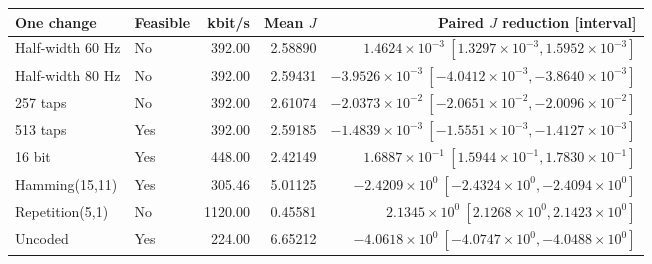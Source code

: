\begin{tabular}{llrrr}
\toprule
One change & Feasible & kbit/s & Mean $J$ & Paired $J$ reduction [interval] \\
\midrule
Half-width 60 Hz & No & 392.00 & 2.58890 & $1.4624\times10^{-3}\ [1.3297\times10^{-3},1.5952\times10^{-3}]$ \\
Half-width 80 Hz & No & 392.00 & 2.59431 & $-3.9526\times10^{-3}\ [-4.0412\times10^{-3},-3.8640\times10^{-3}]$ \\
257 taps & No & 392.00 & 2.61074 & $-2.0373\times10^{-2}\ [-2.0651\times10^{-2},-2.0096\times10^{-2}]$ \\
513 taps & Yes & 392.00 & 2.59185 & $-1.4839\times10^{-3}\ [-1.5551\times10^{-3},-1.4127\times10^{-3}]$ \\
16 bit & Yes & 448.00 & 2.42149 & $1.6887\times10^{-1}\ [1.5944\times10^{-1},1.7830\times10^{-1}]$ \\
Hamming(15,11) & Yes & 305.46 & 5.01125 & $-2.4209\times10^{0}\ [-2.4324\times10^{0},-2.4094\times10^{0}]$ \\
Repetition(5,1) & No & 1120.00 & 0.45581 & $2.1345\times10^{0}\ [2.1268\times10^{0},2.1423\times10^{0}]$ \\
Uncoded & Yes & 224.00 & 6.65212 & $-4.0618\times10^{0}\ [-4.0747\times10^{0},-4.0488\times10^{0}]$ \\
\bottomrule
\end{tabular}
